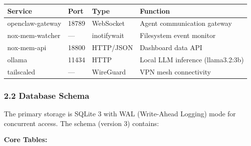 \documentclass[
]{article}
\newcounter{none} %
\begin{document}
{\def\LTcaptype{none} %
\begin{longtable}[]{@{}llll@{}}
\toprule\noalign{}
Service & Port & Type & Function \\
\midrule\noalign{}
\endhead
\bottomrule\noalign{}
\endlastfoot
openclaw-gateway & 18789 & WebSocket & Agent communication gateway \\
nox-mem-watcher & --- & inotifywait & Filesystem event monitor \\
nox-mem-api & 18800 & HTTP/JSON & Dashboard data API \\
ollama & 11434 & HTTP & Local LLM inference (llama3.2:3b) \\
tailscaled & --- & WireGuard & VPN mesh connectivity \\
\end{longtable}
}

\subsubsection{2.2 Database Schema}\label{database-schema}

The primary storage is SQLite 3 with WAL (Write-Ahead Logging) mode for
concurrent access. The schema (version 3) contains:

\textbf{Core Tables:}
\end{document}
